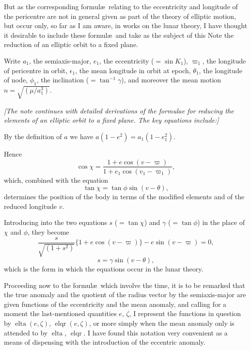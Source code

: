 \documentclass[12pt,a4paper]{article}
\theoremstyle{plain}
\theoremstyle{definition}
\begin{document}
But as the corresponding formul\ae\ relating to the eccentricity and longitude of the pericentre are not in general given as part of the theory of elliptic motion, but occur only, so far as I am aware, in works on the lunar theory, I have thought it desirable to include these formul\ae\ and take as the subject of this Note the reduction of an elliptic orbit to a fixed plane.

Write $a_1$, the semiaxis-major, $e_1$, the eccentricity ($= \sin K_1$), $\varpi_1$, the longitude of pericentre in orbit, $\epsilon_1$, the mean longitude in orbit at epoch, $\theta_1$, the longitude of node, $\phi_1$, the inclination ($= \tan^{-1} \gamma$), and moreover the mean motion $n = \sqrt{(\mu / a_1^3)}$.

\newpage
[180]

\textit{[The note continues with detailed derivations of the formulae for reducing the elements of an elliptic orbit to a fixed plane. The key equations include:]}

By the definition of $a$ we have $a(1 - e^2) = a_1(1 - e_1^2)$.

Hence
\[
\cos \chi = \frac{1 + e \cos(v - \varpi)}{1 + e_1 \cos(v_1 - \varpi_1)},
\]
which, combined with the equation
\[
\tan \chi = \tan \phi \sin(v - \theta),
\]
determines the position of the body in terms of the modified elements and of the reduced longitude $v$.

Introducing into the two equations $s$ ($= \tan \chi$) and $\gamma$ ($= \tan \phi$) in the place of $\chi$ and $\phi$, they become
\[
\frac{s}{\sqrt{(1 + s^2)}} \{1 + e \cos(v - \varpi)\} - e \sin(v - \varpi) = 0,
\]
\[
s = \gamma \sin(v - \theta),
\]
which is the form in which the equations occur in the lunar theory.

Proceeding now to the formul\ae\ which involve the time, it is to be remarked that the true anomaly and the quotient of the radius vector by the semiaxis-major are given functions of the eccentricity and the mean anomaly, and calling for a moment the last-mentioned quantities $e$, $\zeta$, I represent the functions in question by $\operatorname{elta}(e, \zeta)$, $\operatorname{elqr}(e, \zeta)$, or more simply when the mean anomaly only is attended to by $\operatorname{elta}$, $\operatorname{elqr}$. I have found this notation very convenient as a means of dispensing with the introduction of the eccentric anomaly.
\end{document}
